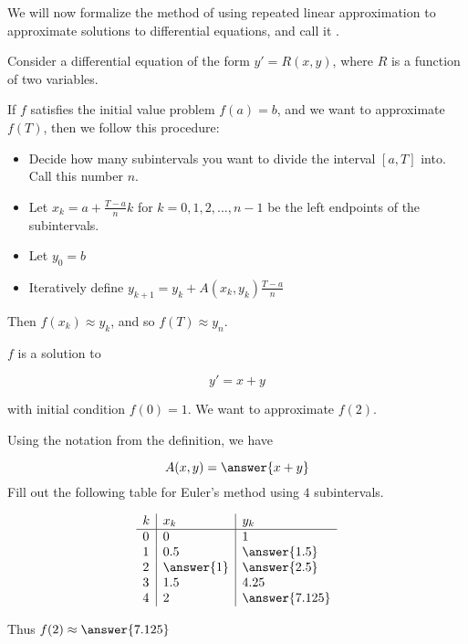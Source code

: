 \documentclass{ximera}
\begin{document}
We will now formalize the method of using repeated linear approximation to approximate solutions to differential equations, and call it .

\begin{definition}
Consider a differential equation of the form $y' = R(x,y)$, where $R$ is a function of two variables.

If $f$ satisfies the initial value problem $f(a) = b$, and we want to approximate $f(T)$, then we follow this procedure:

\begin{itemize}
	\item Decide how many subintervals you want to divide the interval $[a,T]$ into.  Call this number $n$.
	\item Let $x_k = a+\frac{T-a}{n}k$ for $k=0,1,2,...,n-1$ be the left endpoints of the subintervals.
	\item Let $y_0 = b$
	\item Iteratively define $y_{k+1} = y_k+A(x_k,y_k)\frac{T-a}{n}$ 
\end{itemize}

Then $f(x_k) \approx y_k$, and so $f(T) \approx y_{n}$.

\end{definition}

	
\begin{question}
$f$ is a solution to 

\[
y'=x+y
\]

with initial condition $f(0)=1$.  We want to approximate $f(2)$.  

Using the notation from the definition, we have 

\[
A(x,y) = \answer{x+y}
\]
Fill out the following table for Euler's method using $4$ subintervals.

	\[
\begin{array}{l|l|l}
k & x_k & y_k \\ \hline
0 & 0   & 1 \\
1 & 0.5 & \answer{1.5} \\
2 & \answer{1} & \answer{2.5}  \\
3 & 1.5 & 4.25 \\
4 & 2 & \answer{7.125} \\
\end{array}
\]

	Thus $f(2) \approx \answer{7.125}$

\end{question}	
\end{document}
